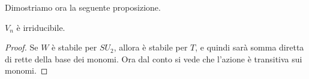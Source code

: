 	Dimostriamo ora la seguente proposizione.
	\begin{myprop}
	 $V_n$ è irriducibile.
	\end{myprop}
	\begin{proof}
	 Se $W$ è stabile per $SU_2$, allora è stabile per $T$, e quindi sarà somma diretta di rette della base dei monomi. Ora dal conto si vede che l'azione è transitiva sui monomi. 
	\end{proof}


	



